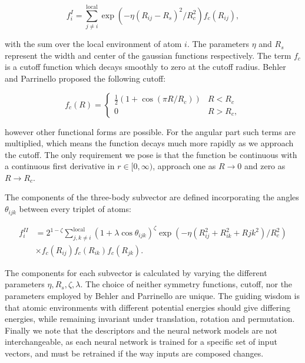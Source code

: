 $$ f_i^I = \sum_{j \neq i}^{\text{local}}
    \exp \left( -\eta(R_{ij} - R_s)^2 / R_c^2 \right) f_c (R_{ij}) , $$

with the sum over the local environment of atom $i$.
The parameters $\eta$ and $R_s$ represent the width and center
of the gaussian functions respectively. The term $f_c$
is a cutoff function which decays smoothly to zero
at the cutoff radius. Behler and Parrinello proposed
the following cutoff:

\begin{equation}
    f_c(R) =
\begin{cases}
    \frac{1}{2}\left(1 + \cos \left(\pi R / R_c \right) \right) & R < R_c \\
    0 & R > R_c ,
\end{cases}
\end{equation}

however other functional forms are possible. For the angular part
such terms are multiplied, which means the function decays much more
rapidly as we approach the cutoff. The only requirement we pose
is that the function be continuous with a continuous first derivative
in $r \in [0, \infty)$,
approach one as $R \rightarrow 0$
and zero as $R \rightarrow R_c$.
\par
The components of the three-body subvector are defined incorporating
the angles $\theta_{ijk}$ between every triplet of atoms:

\begin{equation}
\begin{split}
    f_i^{II} &= 2^{1 - \zeta} \sum_{j,k \neq i}^{\text{local}}
    (1 + \lambda \cos \theta_{ijk})^{\zeta}
    \exp \left( -\eta \left( R_{ij}^2 + R_{ik}^2 + R{jk}^2
    \right) / R_c^2 \right) \\
    & \times f_c(R_{ij}) f_c(R_{ik}) f_c(R_{jk}) .
\end{split}
\end{equation}

The components for each subvector is calculated by varying
the different parameters $\eta, R_s, \zeta, \lambda$.
The choice of neither symmetry functions, cutoff, nor the parameters
employed by Behler and Parrinello are unique. The guiding
wisdom is that atomic environments with different
potential energies should give differing energies,
while remaining invariant under translation, rotation and permutation.
Finally we note that the descriptors and the neural network
models are not interchangeable, as each neural network
is trained for a specific set of input vectors, and must
be retrained if the way inputs are composed changes.

